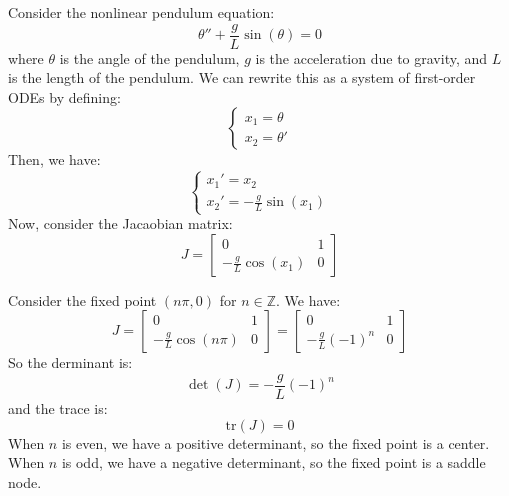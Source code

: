 \documentclass[11pt]{article}
\begin{document}
\begin{definition}
    Consider the nonlinear pendulum equation:
    $$\theta'' + \frac{g}{L}\sin(\theta) = 0$$
    where \( \theta \) is the angle of the pendulum, \( g \) is the acceleration due to gravity, and \( L \) is the length of the pendulum. We can rewrite this as a system of first-order ODEs by defining:
    $$\begin{cases}
    x_1 = \theta \\
    x_2 = \theta'
    \end{cases}$$
    Then, we have:
    $$\begin{cases}
    x_1' = x_2 \\
    x_2' = -\frac{g}{L}\sin(x_1)    
    \end{cases}$$
    Now, consider the Jacaobian matrix:
    $$J = \begin{bmatrix}
    0 & 1 \\
    -\frac{g}{L}\cos(x_1) & 0
    \end{bmatrix}$$
    
    Consider the fixed point $(n \pi, 0)$ for \( n \in \mathbb{Z} \). We have:
    $$J = \begin{bmatrix}
    0 & 1 \\
    -\frac{g}{L}\cos(n \pi) & 0
    \end{bmatrix} = \begin{bmatrix}
    0 & 1 \\
    -\frac{g}{L}(-1)^n & 0
    \end{bmatrix}$$
    So the derminant is:
    $$\det(J) = -\frac{g}{L}(-1)^n$$
    and the trace is:
    $$\text{tr}(J) = 0$$
    When $n$ is even, we have a positive determinant, so the fixed point is a center. When $n$ is odd, we have a negative determinant, so the fixed point is a saddle node.
\end{definition}
\end{document}
